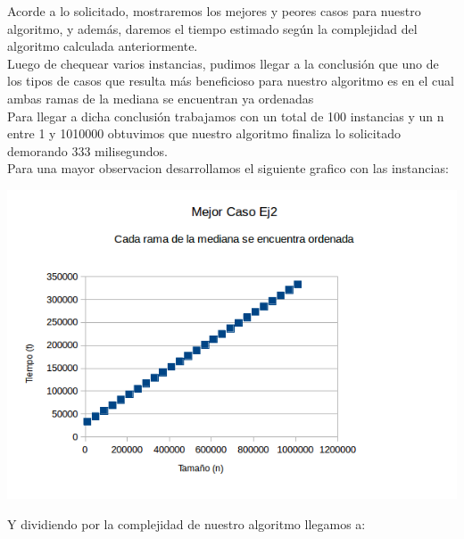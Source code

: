 \indent Acorde a lo solicitado, mostraremos los mejores y peores casos para nuestro algoritmo, y adem\'as, daremos el tiempo estimado 
seg\'un la complejidad del algoritmo calculada anteriormente.\\

Luego de chequear varios instancias, pudimos llegar a la conclusi\'on que uno de los tipos de casos que resulta m\'as beneficioso para nuestro algoritmo
es en el cual ambas ramas de la mediana se encuentran ya ordenadas\\

Para llegar a dicha conclusi\'on trabajamos con un total de 100 instancias y un n entre 1 y 1010000 obtuvimos que nuestro
algoritmo finaliza lo solicitado demorando 333 milisegundos.\\

Para una mayor observacion desarrollamos el siguiente grafico con las instancias:\\

\vspace*{0.3cm} \vspace*{0.3cm}
  \begin{center}
 \includegraphics[scale=0.8]{./EJ2/grafico2ejmejorcaso.png}
  \end{center}
  \vspace*{0.3cm}
  
Y dividiendo por la complejidad de nuestro algoritmo llegamos a:\\

